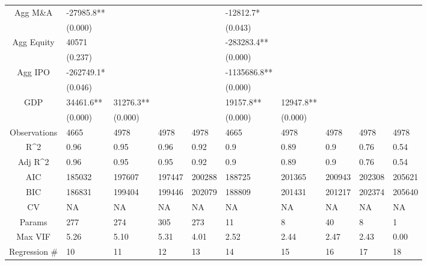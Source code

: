 \documentclass{article}
\begin{document}
\begin{table}[H]
\begin{tabular}{|clllllllll|}
  Agg M\&A & -27985.8** &  &  &  & -12812.7* &  &  &  &  \\ 
   & (0.000) &  &  &  & (0.043) &  &  &  &  \\ 
  Agg Equity & 40571 &  &  &  & -283283.4** &  &  &  &  \\ 
   & (0.237) &  &  &  & (0.000) &  &  &  &  \\ 
  Agg IPO & -262749.1* &  &  &  & -1135686.8** &  &  &  &  \\ 
   & (0.046) &  &  &  & (0.000) &  &  &  &  \\ 
  GDP & 34461.6** & 31276.3** &  &  & 19157.8** & 12947.8** &  &  &  \\ 
   & (0.000) & (0.000) &  &  & (0.000) & (0.000) &  &  &  \\ 
  \hline 
 Observations & 4665 & 4978 & 4978 & 4978 & 4665 & 4978 & 4978 & 4978 & 4978 \\ 
  R^2 & 0.96 & 0.95 & 0.96 & 0.92 & 0.9 & 0.89 & 0.9 & 0.76 & 0.54 \\ 
  Adj R^2 & 0.96 & 0.95 & 0.95 & 0.92 & 0.9 & 0.89 & 0.9 & 0.76 & 0.54 \\ 
  AIC & 185032 & 197607 & 197447 & 200288 & 188725 & 201365 & 200943 & 202308 & 205621 \\ 
  BIC & 186831 & 199404 & 199446 & 202079 & 188809 & 201431 & 201217 & 202374 & 205640 \\ 
  CV & NA & NA & NA & NA & NA & NA & NA & NA & NA \\ 
  Params & 277 & 274 & 305 & 273 & 11 & 8 & 40 & 8 & 1 \\ 
  Max VIF & 5.26 & 5.10 & 5.31 & 4.01 & 2.52 & 2.44 & 2.47 & 2.43 & 0.00 \\ 
  Regression \# & 10 & 11 & 12 & 13 & 14 & 15 & 16 & 17 & 18 \\ 
   \hline
\end{tabular}
 
\end{table}
\end{document}
